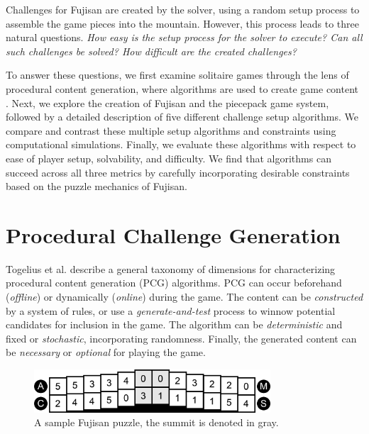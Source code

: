 \documentclass[10pt,journal,compsoc]{IEEEtran}
\begin{document}
Challenges for Fujisan are created by the solver, using a random setup process to assemble the game pieces into the mountain. However, this process leads to three natural questions. {\it How easy is the setup process for the solver to execute? Can all such challenges be solved? How difficult are the created challenges? }

To answer these questions, we first examine solitaire games through the lens of procedural content generation, where algorithms are used to create game content \cite{PCGSURVEY}. Next, we explore the creation of Fujisan and the piecepack game system, followed by a detailed description of five different challenge setup algorithms. We compare and contrast these multiple setup algorithms and constraints using computational simulations. Finally, we evaluate these algorithms with respect to ease of player setup, solvability, and difficulty. We find that algorithms can succeed across all three metrics by carefully incorporating desirable constraints based on the puzzle mechanics of Fujisan. 


\section{Procedural Challenge Generation}  \label{sec:Background}

\noindent
Togelius et al. \cite{SBPCG} describe a general taxonomy of dimensions for characterizing procedural content generation (PCG) algorithms. PCG can occur beforehand ({\it offline}) or dynamically ({\it online}) during the game. The content can be {\it constructed}
by a system of rules, or use a {\it generate-and-test} process to winnow potential candidates for inclusion in the game.
The algorithm can be {\it deterministic} and fixed or {\it stochastic}, incorporating randomness.
Finally, the generated content can be {\it necessary} or {\it optional} for playing the game.

\begin{figure}[b]
\includegraphics[width=8.8cm]{graphics/piecepackexample.png}
\caption{A sample Fujisan puzzle, the summit is denoted in gray.}
\label{fig:SampleFujisan}
\end{figure}
\end{document}
